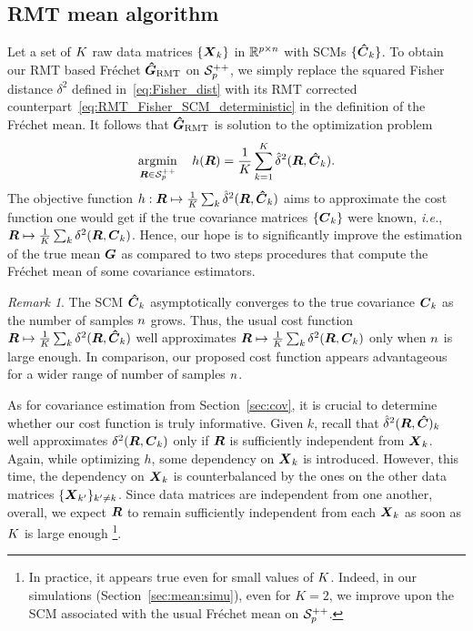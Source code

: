 \documentclass{article}
\theoremstyle{plain}
\theoremstyle{definition}
\theoremstyle{remark}
\newtheorem{remark}[theorem]{Remark}
\begin{document}
\subsection{RMT mean algorithm}
\label{sec:mean:algo}
Let a set of $K$ raw data matrices $\{\boldsymbol{X}_k\}$ in $\mathbb{R}^{p\times n}$ with SCMs $\{\boldsymbol{\hat{C}}_k\}$.
To obtain our RMT based Fréchet $\boldsymbol{\hat{G}}_{\textup{RMT}}$ on $\mathcal{S}^{++}_{p}$, we simply replace the squared Fisher distance $\delta^2$ defined in~\eqref{eq:Fisher_dist} with its RMT corrected counterpart~\eqref{eq:RMT_Fisher_SCM_deterministic} in the definition of the Fréchet mean.
It follows that $\boldsymbol{\hat{G}}_{\textup{RMT}}$ is solution to the optimization problem
\begin{equation}
    \operatorname*{argmin}_{\boldsymbol{R}\in\mathcal{S}^{++}_{p}} \quad h(\boldsymbol{R}) = \frac1{K}\sum_{k=1}^{K} \hat{\delta}^2(\boldsymbol{R},\boldsymbol{\hat{C}}_k).
\label{eq:RMT_mean_optim_problem}
\end{equation}
The objective function $h:\boldsymbol{R}\mapsto\frac1{K}\sum_k\hat{\delta}^2(\boldsymbol{R},\boldsymbol{\hat{C}}_k)$ aims to approximate the cost function one would get if the true covariance matrices $\{\boldsymbol{C}_k\}$ were known, \emph{i.e.}, $\boldsymbol{R}\mapsto\frac1{K}\sum_k\delta^2(\boldsymbol{R},\boldsymbol{C}_k)$.
Hence, our hope is to significantly improve the estimation of the true mean $\boldsymbol{G}$ as compared to two steps procedures that compute the Fréchet mean of some covariance estimators.
%
\begin{remark}
    The SCM $\boldsymbol{\hat{C}}_k$ asymptotically converges to the true covariance $\boldsymbol{C}_k$ as the number of samples $n$ grows.
    Thus, the usual cost function $\boldsymbol{R}\mapsto\frac1{K}\sum_k\delta^2(\boldsymbol{R},\boldsymbol{\hat{C}}_k)$ well approximates $\boldsymbol{R}\mapsto\frac1{K}\sum_k\delta^2(\boldsymbol{R},\boldsymbol{C}_k)$ only when $n$ is large enough.
    In comparison, our proposed cost function appears advantageous for a wider range of number of samples $n$.
\end{remark}

As for covariance estimation from Section~\ref{sec:cov}, it is crucial to determine whether our cost function is truly informative.
Given $k$, recall that $\hat{\delta}^2(\boldsymbol{R},\boldsymbol{\hat{C}})_k$ well approximates $\delta^2(\boldsymbol{R},\boldsymbol{C}_k)$ only if $\boldsymbol{R}$ is sufficiently independent from $\boldsymbol{X}_k$.
Again, while optimizing $h$, some dependency on $\boldsymbol{X}_k$ is introduced.
However, this time, the dependency on $\boldsymbol{X}_k$ is counterbalanced by the ones on the other data matrices $\{\boldsymbol{X}_{k'}\}_{k'\neq k}$.
Since data matrices are independent from one another, overall, we expect $\boldsymbol{R}$ to remain sufficiently independent from each $\boldsymbol{X}_k$ as soon as $K$ is large enough%
\footnote{
    In practice, it appears true even for small values of $K$.
    Indeed, in our simulations (Section~\ref{sec:mean:simu}), even for $K=2$, we improve upon the SCM associated with the usual Fréchet mean on $\mathcal{S}^{++}_{p}$.
}.
\end{document}
